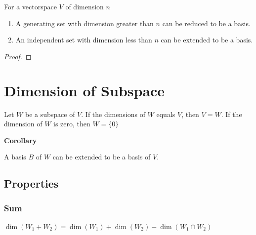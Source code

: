 \documentclass[11pt]{article}
\begin{document}
\begin{theorem}
For a vectorspace \(V\) of dimension \(n\)

\begin{enumerate}
\item A generating set with dimension greater than \(n\) can be reduced to be a basis.

\item An independent set with dimension less than \(n\) can be extended to be a basis.
\end{enumerate}
\end{theorem}
\begin{proof}

\end{proof}

\section{Dimension of Subspace}
\label{sec:orgheadline10}
\begin{theorem}
Let \(W\) be a subspace of \(V\).  If the dimensions of \(W\) equals \(V\), then \(V = W\).  If the dimension of \(W\) is zero, then \(W = \{0\}\)

\textbf{Corollary}

A basis \(B\) of \(W\) can be extended to be a basis of \(V\).
\end{theorem}

\subsection{Properties}
\label{sec:orgheadline9}
\subsubsection{Sum}
\label{sec:orgheadline7}

\(\dim(W_1 + W_2) = \dim (W_1) + \dim (W_2) - \dim (W_1 \cap W_2)\)
\end{document}
